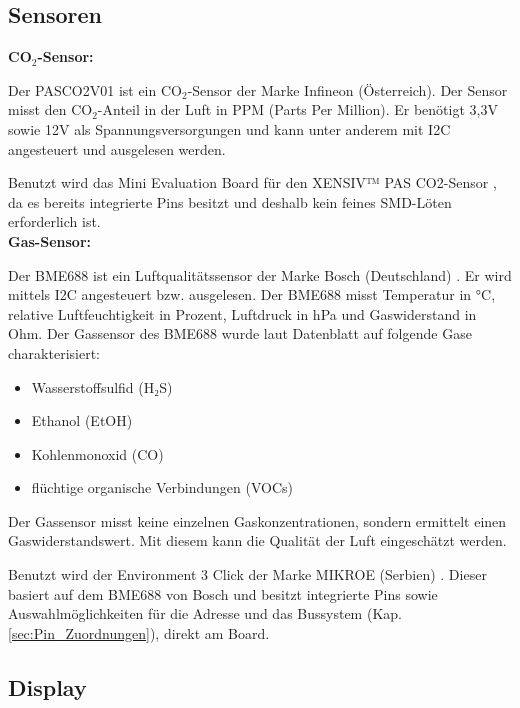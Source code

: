 \begin{inhalt}
\subsection{Sensoren}

\textbf{CO$_2$-Sensor:}

\smallskip

Der PASCO2V01 ist ein CO$_2$-Sensor der Marke Infineon (Österreich). Der Sensor misst den CO$_2$-Anteil in der Luft in PPM (Parts Per Million). Er benötigt 3,3V sowie 12V als Spannungsversorgungen und kann unter anderem mit I2C angesteuert und ausgelesen werden. \cite{PASCO2V01}

Benutzt wird das Mini Evaluation Board für den XENSIV™ PAS CO2-Sensor \cite{PASCO2_Miniboard}, da es bereits integrierte Pins besitzt und deshalb kein feines SMD-Löten erforderlich ist. 
\bigskip \\

\textbf{Gas-Sensor:}

\smallskip

Der BME688 ist ein Luftqualitätssensor der Marke Bosch (Deutschland) \cite{BME688}. Er wird mittels I2C angesteuert bzw. ausgelesen. Der BME688 misst Temperatur in °C, relative Luftfeuchtigkeit in Prozent, Luftdruck in hPa und Gaswiderstand in Ohm. Der Gassensor des BME688 wurde laut Datenblatt auf folgende Gase charakterisiert:

\begin{itemize}
    \item Wasserstoffsulfid (H₂S) 
    \item Ethanol (EtOH) 
    \item Kohlenmonoxid (CO)
    \item flüchtige organische Verbindungen (VOCs)
\end{itemize}

Der Gassensor misst keine einzelnen Gaskonzentrationen, sondern ermittelt einen Gaswiderstandswert. Mit diesem kann die Qualität der Luft eingeschätzt werden. \cite{BME688}
\smallskip

Benutzt wird der Environment 3 Click der Marke MIKROE (Serbien) \cite{ENVIRONMENT_3_CLICK}. Dieser basiert auf dem BME688 von Bosch und besitzt integrierte Pins sowie Auswahlmöglichkeiten für die Adresse und das Bussystem (Kap. \ref{sec:Pin_Zuordnungen}), direkt am Board.

\subsection{Display}


\end{inhalt}
